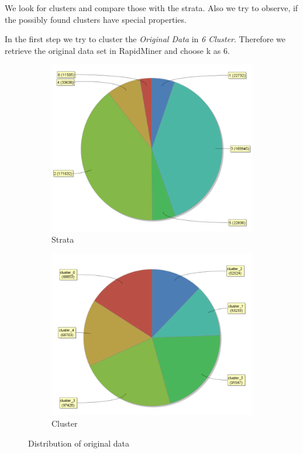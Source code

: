 \setlength{\parindent}{0em}
We look for clusters and compare those with the strata. Also we try to observe, if the possibly found clusters have special properties. %

In the first step we try to cluster the \textit{Original Data} in \textit{6 Cluster}. Therefore we retrieve the original data set in RapidMiner and choose k as 6.
 
\begin{figure}[!htbp]
\vspace*{-1.5em}
\centering
\begin{subfigure}{.35\textwidth}
  \centering
  \includegraphics[width=.8\linewidth]{ClusterOrigRapidStrata.PNG}
  \caption{Strata}
  \label{fig:OrgSt}
\end{subfigure}%
\begin{subfigure}{.35\textwidth}
  \centering
  \includegraphics[width=.8\linewidth]{ClusterOrigRapidCluster.PNG}
  \caption{Cluster}
  \label{fig:OrgCl}
\end{subfigure}
\caption{Distribution of original data}
\label{fig:OrgDist}
\end{figure}
\vspace*{-1.5em}

